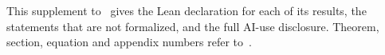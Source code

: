 \newcommand{\papertitle}{Supplement to ``Exact and perturbative criteria for finite nonnegative linearization'': formalization and AI use}
\newcommand{\papershort}{SUPPLEMENT: EXACT AND PERTURBATIVE CRITERIA FOR FINITE LINEARIZATION}
\newcommand{\paperdate}{November 1, 2026}



\maketitle

\noindent This supplement to~\cite{main} gives the Lean declaration for each of its results, the statements that are not formalized, and the full AI-use disclosure. Theorem, section, equation and appendix numbers refer to~\cite{main}.

